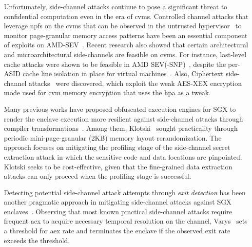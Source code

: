 Unfortunately, side-channel attacks continue to pose a significant threat to confidential computation even in the era of \glspl{cvm}.
Controlled channel attacks that leverage \glspl{npf} on the \glspl{cvm} that can be observed in the untrusted hypervisor~\cite{xu2015controlledchannel} to monitor page-granular memory access patterns have been an
essential component of exploits on AMD-SEV~\cite{li2022systematic,werner2019severest,morbitzer2018severed,li2021cipherleaks,heckler,wesee}.
Recent research also showed that certain architectural and microarchitectural side-channels are feasible on \glspl{cvm}.
For instance, last-level cache attacks were shown to be feasible in AMD SEV(-SNP)~\cite{sevstep}, despite the per-ASID cache line isolation in place for virtual machines~\cite{li2021crossline}.
Also, Ciphertext side-channel attacks~\cite{li2021cipherleaks,li2022systematic} were discovered, which exploit the weak AES-XEX encryption mode used for \gls{cvm} memory encryption that uses the \gls{hpa} as a tweak.


Many previous works have proposed obfuscated execution engines for SGX to render the enclave execution more resilient against side-channel attacks through compiler transformations~\cite{ahmad2019obfuscuro,obelix,shinde2016preventing,zhang2020klotski}.
Among them, Klotski~\cite{zhang2020klotski} sought practicality through periodic mini-page-granular (2KB) memory layout rerandomization.
The approach focuses on mitigating the profiling stage of the side-channel secret extraction attack in which the sensitive code and data locations are pinpointed.
Klotski seeks to be cost-effective, given that the fine-grained data extraction attacks can only proceed when the profiling stage is successful.


Detecting potential side-channel attack attempts through \emph{exit detection} has been another pragmatic approach in mitigating side-channel attacks against SGX enclaves~\cite{oleksenko2018varys,shih2017tsgx,dejavu,fu2017sgxlapd}.
Observing that most known practical side-channel attacks require frequent \gls{aex} to acquire necessary temporal resolution on the channel, Varys~\cite{oleksenko2018varys} sets a threshold for \gls{aex} rate and terminates the enclave if the observed exit rate exceeds the threshold.


